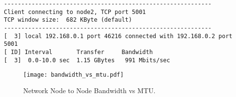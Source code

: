 \lstset{style=type}
\begin{lstlisting}
------------------------------------------------------------
Client connecting to node2, TCP port 5001
TCP window size:  682 KByte (default)
------------------------------------------------------------
[  3] local 192.168.0.1 port 46216 connected with 192.168.0.2 port 5001
[ ID] Interval       Transfer     Bandwidth
[  3]  0.0-10.0 sec  1.15 GBytes   991 Mbits/sec
\end{lstlisting}


\begin{figure}
	\centering	
	\texttt{[image: bandwidth\_vs\_mtu.pdf]}
	\caption{Network Node to Node Bandwidth vs MTU.}
\end{figure}





